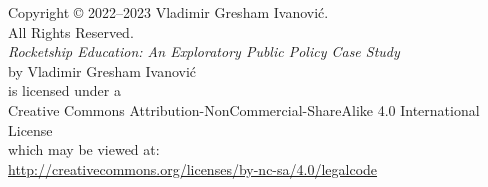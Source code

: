 
\begin{vplace}[1]
\footnotesize
    \begin{center}
        Copyright © 2022–2023 Vladimir Gresham Ivanović.\\
        All Rights Reserved.\\\bigskip\bigskip
        \textit{Rocketship Education: An Exploratory Public Policy Case Study}\\
        by Vladimir Gresham Ivanović\\
        is licensed under a \\
        Creative Commons Attribution-NonCommercial-ShareAlike 4.0 International License\\
        which may be viewed at:\\
        \url{http://creativecommons.org/licenses/by-nc-sa/4.0/legalcode}
    \end{center}
 \end{vplace}
 
